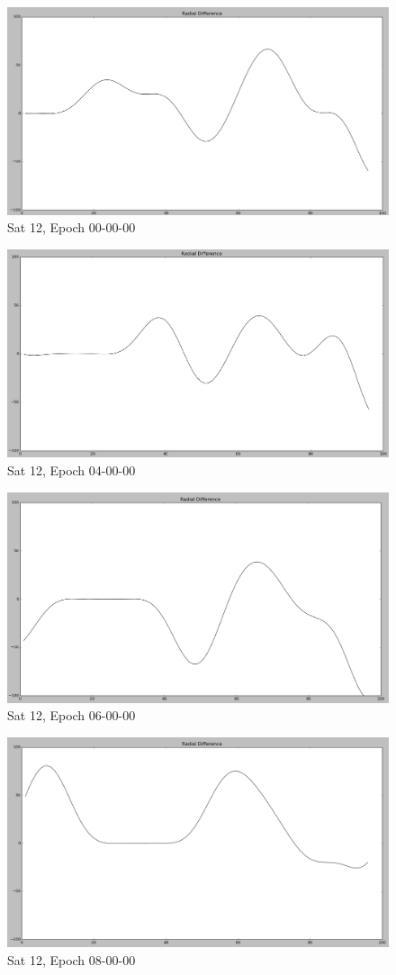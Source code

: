 \documentclass[12pt,a4paper]{article}
\begin{document}
	\begin{figure}[H]
	\centering
	\includegraphics[width=0.6\linewidth]{"images/12 - 00"}
	\caption{Sat 12, Epoch 00-00-00}

	\label{fig:12-00}
	\end{figure}
	\begin{figure}[H]
	\centering
	\includegraphics[width=0.6\linewidth]{"images/12 - 04"}
	\caption{Sat 12, Epoch 04-00-00}
	\label{fig:12-04}
	\end{figure}
	\begin{figure}[H]
	\centering
	\includegraphics[width=0.6\linewidth]{"images/12 - 06"}
	\caption{Sat 12, Epoch 06-00-00}
	\label{fig:12-06}
	\end{figure}
	\begin{figure}[H]
	\centering
	\includegraphics[width=0.6\linewidth]{"images/12 - 08"}
	\caption{Sat 12, Epoch 08-00-00}
	\label{fig:12-08}
	\end{figure}
\end{document}
